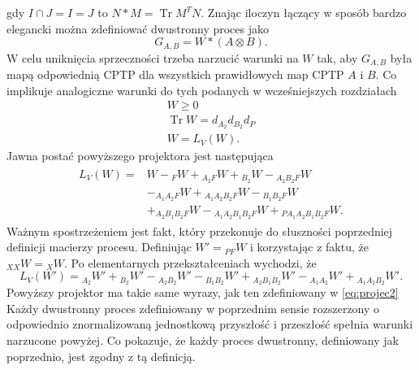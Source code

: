 \documentclass[10pt]{article} %
\DeclareMathOperator{\Trs}{Tr}
\begin{document}
gdy $I \cap J = I = J$ to $N * M = \Trs M^T N$.
Znając iloczyn łączący w sposób bardzo elegancki można zdefiniować dwustronny proces jako
\begin{equation}
G_{A,B} = W * (A \otimes B).
\end{equation}
W celu uniknięcia sprzeczności trzeba narzucić warunki na $W$ tak, aby $G_{A,B}$ była mapą odpowiednią CPTP dla wszystkich prawidłowych map CPTP $A$ i $B$. Co implikuje analogiczne warunki do tych podanych w wcześniejszych rozdziałach
\begin{gather}
W \geq 0 \\
\Trs W = d_{A_2}d_{B_2}d_P \\
W = L_V(W).
\end{gather} 
Jawna postać powyższego projektora jest następująca
\begin{align}
\begin{split}
L_V(W) =& W -{}_FW + {}_{A_2F}W + {}_{B_2}W - {}_{A_2B_2F}W\\ &- {}_{A_1A_2F}W + {}_{A_1A_2B_2F}W - {}_{B_1B_2F}W \\&+ {}_{A_2B_1B_2F}W - {}_{A_1A_2B_1B_2F}W + {}_{PA_1A_2B_1B_2F}W.
\end{split}
\end{align}
Ważnym spostrzeżeniem jest fakt, który przekonuje do słuszności poprzedniej definicji macierzy procesu. Definiując $W' = {}_{PF}W$ i korzystając z faktu, że
${}_{XX}W = {}_{X}W$. Po elementarnych przekształceniach wychodzi, że
\begin{equation}
L_V(W') = {}_{A_2}W' + {}_{B_2}W' - {}_{A_2B_2}W' - {}_{B_1B_2}W' + {}_{A_2B_1B_2}W' - {}_{A_1A_2}W' + {}_{A_1A_2B_2}W'.
\end{equation}
Powyższy projektor ma takie same wyrazy, jak ten zdefiniowany w \eqref{eq:projec2} 
Każdy dwustronny proces zdefiniowany w poprzednim sensie rozszerzony o odpowiednio znormalizowaną jednostkową przyszłość i przeszłość spełnia warunki narzucone powyżej. Co pokazuje, że każdy proces dwustronny, definiowany jak poprzednio, jest zgodny z tą definicją.
\end{document}

